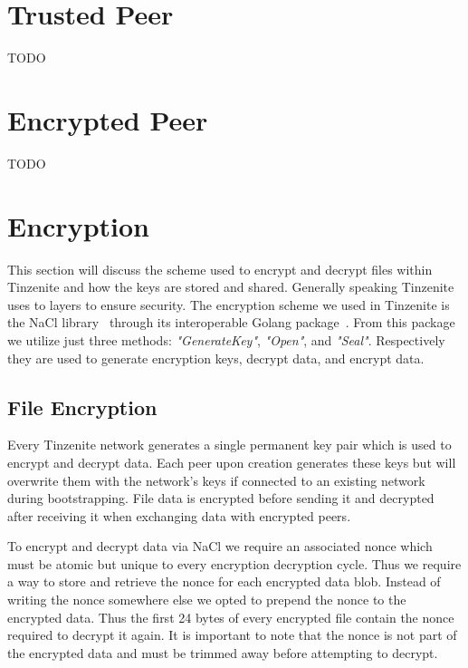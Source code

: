 \section{Trusted Peer}

TODO

\section{Encrypted Peer}

TODO

\section{Encryption}
\label{sec:Encryption}

This section will discuss the scheme used to encrypt and decrypt files within Tinzenite and how the keys are stored and shared.
Generally speaking Tinzenite uses to layers to ensure security.
The encryption scheme we used in Tinzenite is the NaCl library~\cite{bernstein2012security} through its interoperable Golang package~\cite{web:site:golang:box}.%
From this package we utilize just three methods: \textit{"GenerateKey"}, \textit{"Open"}, and \textit{"Seal"}.
Respectively they are used to generate encryption keys, decrypt data, and encrypt data.

\subsection{File Encryption}
\label{sub:File Encryption}

Every Tinzenite network generates a single permanent key pair which is used to encrypt and decrypt data.
Each peer upon creation generates these keys but will overwrite them with the network's keys if connected to an existing network during bootstrapping.
File data is encrypted before sending it and decrypted after receiving it when exchanging data with encrypted peers.

To encrypt and decrypt data via NaCl we require an associated nonce which must be atomic but unique to every encryption decryption cycle.
Thus we require a way to store and retrieve the nonce for each encrypted data blob.
Instead of writing the nonce somewhere else we opted to prepend the nonce to the encrypted data. %
Thus the first 24 bytes of every encrypted file contain the nonce required to decrypt it again.
It is important to note that the nonce is not part of the encrypted data and must be trimmed away before attempting to decrypt.

